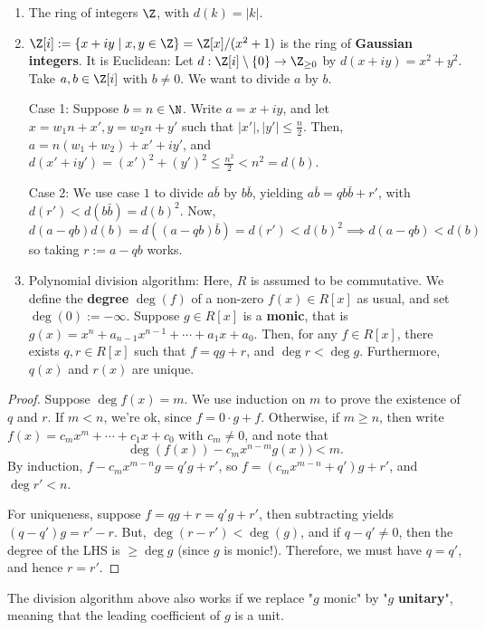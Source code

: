 \begin{ex}
    \begin{enumerate}
        \item The ring of integers $\Z$, with $d(k) = |k|$.
        \item $\Z[i]:=\{ x+iy \mid x,y \in \Z\}=\Z[x]/(x^2+1)$ is the ring of \textbf{Gaussian integers}. It is Euclidean: Let $d : \Z[i]\setminus\{0\} \to \Z_{\geq 0}$ by $d(x+iy) = x^2+y^2$. Take $a,b \in \Z[i]$ with $b \neq 0$. We want to divide $a$ by $b$.

        Case 1: Suppose $b=n \in \N$. Write $a = x+iy$, and let $x=w_1n+x',y=w_2n+y'$ such that $|x'|,|y'| \leq \frac{n}{2}$. Then, $a = n(w_1+w_2) +x'+iy'$, and $d(x'+iy') = (x')^2 +(y')^2 \leq \frac{n^2}{2}<n^2 = d(b)$.

        Case 2: We use case $1$ to divide $a \bar b$ by $b \bar b$, yielding $a \bar b= q b \bar b + r'$, with $d(r') < d(b\bar b) = d(b)^2$. Now,
        $$d(a-qb)d(b)= d((a-qb)\bar b)= d(r') < d(b)^2 \implies d(a-qb) < d(b)$$
        so taking $r:= a-qb$ works.
        \item Polynomial division algorithm: Here, $R$ is assumed to be commutative. We define the \textbf{degree} $\deg (f)$ of a non-zero $f(x) \in R[x]$ as usual, and set $\deg (0):=-\infty$. Suppose $g \in R[x]$ is a \textbf{monic}, that is $g(x) =x^n+a_{n-1}x^{n-1}+\cdots +a_1x+a_0$. Then, for any $f \in R[x]$, there exists $q, r \in R[x]$ such that $f = qg +r$, and $\deg r < \deg g$. Furthermore, $q(x)$ and $r(x)$ are unique.
    \end{enumerate}
    \begin{proof}
        Suppose $\deg f(x) = m$. We use induction on $m$ to prove the existence of $q$ and $r$. If $m <n$, we're ok, since $f=0\cdot g +f$. Otherwise, if $m \geq n$, then write $f(x) =c_mx^m +\cdots +c_1x+c_0$ with $c_m\neq 0$, and note that
        $$\deg (f(x))-c_mx^{n-m}g(x))<m.$$
        By induction, $f-c_mx^{m-n}g=q'g+r'$, so $f = (c_mx^{m-n}+q')g + r'$, and $\deg r' < n$.

        For uniqueness, suppose $f=qg+r=q'g+r'$, then subtracting yields $(q-q')g=r'-r$. But, $\deg (r-r') < \deg (g)$, and if $q-q' \neq 0$, then the degree of the LHS is $\geq \deg g$ (since $g$ is monic!). Therefore, we must have $q=q'$, and hence $r=r'$.
    \end{proof}
\end{ex}

\begin{rmk}
    The division algorithm above also works if we replace "$g$ monic" by "$g$ \textbf{unitary}", meaning that the leading coefficient of $g$ is a unit.
\end{rmk}

